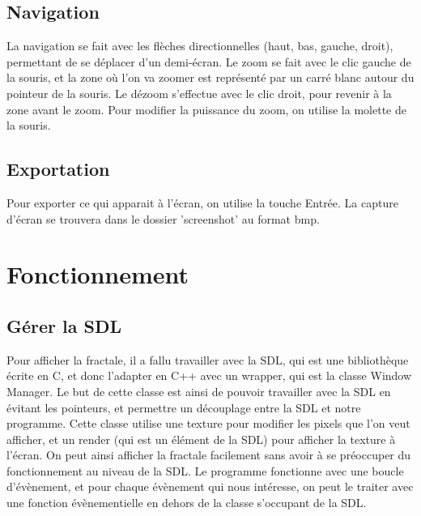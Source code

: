 \documentclass{article}
\begin{document}
\subsection{Navigation}
	La navigation se fait avec les flèches directionnelles (haut, bas, gauche, droit), permettant de se déplacer d'un demi-écran.
	Le zoom se fait avec le clic gauche de la souris, et la zone où l'on va zoomer est représenté par un carré blanc autour du pointeur de la souris.
	Le dézoom s'effectue avec le clic droit, pour revenir à la zone avant le zoom.
	Pour modifier la puissance du zoom, on utilise la molette de la souris.
	\subsection{Exportation}
	Pour exporter ce qui apparait à l'écran, on utilise la touche Entrée.
	La capture d'écran se trouvera dans le dossier 'screenshot' au format bmp.
	\section{Fonctionnement}
	\subsection{Gérer la SDL}
	Pour afficher la fractale, il a fallu travailler avec la SDL, qui est une bibliothèque écrite en C, et donc l'adapter en C++ avec un wrapper, qui est la classe Window Manager.
	Le but de cette classe est ainsi de pouvoir travailler avec la SDL en évitant les pointeurs, et permettre un découplage entre la SDL et notre programme.
	Cette classe utilise une texture pour modifier les pixels que l'on veut afficher, et un render (qui est un élément de la SDL) pour afficher la texture à l'écran.
	On peut ainsi afficher la fractale facilement sans avoir à se préoccuper du fonctionnement au niveau de la SDL.
	Le programme fonctionne avec une boucle d'évènement, et pour chaque évènement qui nous intéresse, on peut le traiter avec une fonction évènementielle en dehors de la classe s'occupant de la SDL.
\end{document}
